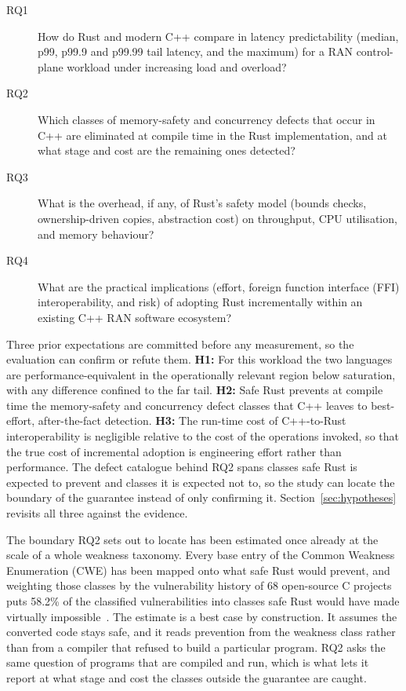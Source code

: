 \documentclass[english,oneside,a4paper,censored,csm,software-track-2020]{HYthesisML}
\begin{document}
\begin{description}
  \item[RQ1] How do Rust and modern C++ compare in latency predictability (median, p99,
        p99.9 and p99.99 tail latency, and the maximum) for a RAN control-plane workload
        under increasing load and overload?
  \item[RQ2] Which classes of memory-safety and concurrency defects that occur in C++ are
        eliminated at compile time in the Rust implementation, and at what stage and cost
        are the remaining ones detected?
  \item[RQ3] What is the overhead, if any, of Rust's safety model (bounds checks,
        ownership-driven copies, abstraction cost) on throughput, CPU utilisation, and
        memory behaviour?
  \item[RQ4] What are the practical implications (effort, foreign function interface (FFI)
        interoperability, and risk) of adopting Rust incrementally within an existing C++ RAN
        software ecosystem?
\end{description}

Three prior expectations are committed before any measurement, so the evaluation can confirm or
refute them. \textbf{H1:} For this workload the two languages are performance-equivalent in the
operationally relevant region below saturation, with any difference confined to the far tail.
\textbf{H2:} Safe Rust prevents at compile time the memory-safety and concurrency defect classes
that C++ leaves to best-effort, after-the-fact detection. \textbf{H3:} The run-time cost of
C++-to-Rust interoperability is negligible relative to the cost of the operations invoked, so
that the true cost of incremental adoption is engineering effort rather than performance. The
defect catalogue behind RQ2 spans classes safe Rust is expected to prevent and classes it is
expected not to, so the study can locate the boundary of the guarantee instead of only confirming
it. Section~\ref{sec:hypotheses} revisits all three against the evidence.

The boundary RQ2 sets out to locate has been estimated once already at the scale of a whole
weakness taxonomy. Every base entry of the Common Weakness Enumeration (CWE) has been mapped
onto what safe Rust would prevent, and weighting those classes by the vulnerability history of
68 open-source C projects puts 58.2\% of the classified vulnerabilities into classes safe Rust
would have made virtually impossible~\cite{meneely2025justuserust}. The estimate is a best case
by construction. It assumes the converted code stays safe, and it reads prevention from the
weakness class rather than from a compiler that refused to build a particular program. RQ2 asks
the same question of programs that are compiled and run, which is what lets it report at what
stage and cost the classes outside the guarantee are caught.
\end{document}
